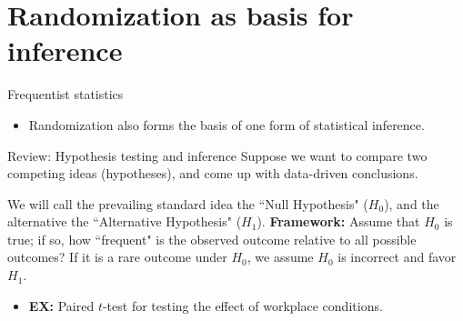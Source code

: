 \section{Randomization as basis for inference}

\begin{frame}[allowframebreaks]{Frequentist statistics}
  \begin{itemize}
    \item Randomization also forms the basis of one form of statistical inference.
  \end{itemize}
  
  \begin{block}{Review: Hypothesis testing and inference}
    Suppose we want to compare two competing ideas (hypotheses), and come up with data-driven conclusions.
    
    We will call the prevailing standard idea the ``Null Hypothesis" ($H_0$), and the alternative the ``Alternative Hypothesis" ($H_1$).
    \textbf{Framework:} Assume that $H_0$ is true; if so, how ``frequent" is the observed outcome relative to all possible outcomes? If it is a rare outcome under $H_0$, we assume $H_0$ is incorrect and favor $H_1$. 
  \end{block}
  
  \framebreak
  
  \begin{itemize}
    \item \textbf{EX:} Paired $t$-test for testing the effect of workplace conditions.
    

    
    

\end{itemize}
\end{frame}
